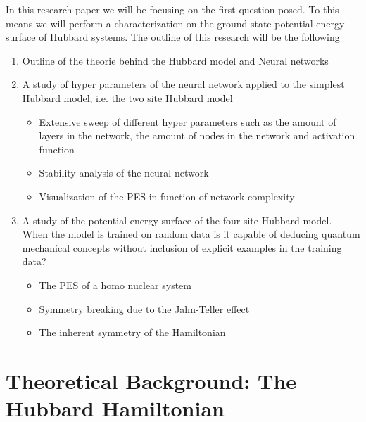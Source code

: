 \documentclass[12pt]{article}
\begin{document}
In this research paper we will be focusing on the first question posed. To this means we will perform a characterization on the ground state potential energy surface of Hubbard systems. The outline of this research will be the following
\begin{enumerate}
	\item Outline of the theorie behind the Hubbard model and Neural networks
	\item A study of hyper parameters of the neural network applied to the simplest Hubbard model, i.e. the two site Hubbard model
	\begin{itemize}
		\item Extensive sweep of different hyper parameters such as the amount of layers in the network, the amount of nodes in the network and activation function
		\item Stability analysis of the neural network
		\item Visualization of the PES in function of network complexity
	\end{itemize}
	\item A study of the potential energy surface of the four site Hubbard model. When the model is trained on random data is it capable of deducing quantum mechanical concepts without inclusion of explicit examples in the training data? 
	\begin{itemize}
		\item The PES of a homo nuclear system
		\item Symmetry breaking due to the Jahn-Teller effect
		\item The inherent symmetry of the Hamiltonian
	\end{itemize} 
\end{enumerate}
\newpage
\section{Theoretical Background: The Hubbard Hamiltonian}
\end{document}
